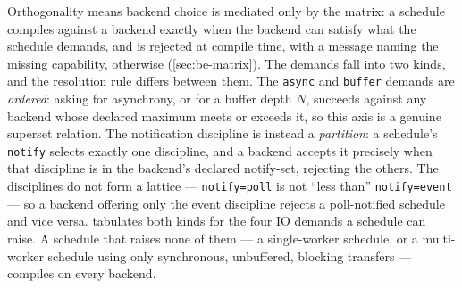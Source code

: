 Orthogonality means backend choice is mediated only by the matrix: a schedule
compiles against a backend exactly when the backend can satisfy what the schedule
demands, and is rejected at compile time, with a message naming the missing
capability, otherwise (\cref{sec:be-matrix}). The demands fall into two kinds, and
the resolution rule differs between them. The \texttt{async} and \texttt{buffer}
demands are \emph{ordered}: asking for asynchrony, or for a buffer depth $N$,
succeeds against any backend whose declared maximum meets or exceeds it, so this
axis is a genuine superset relation. The notification discipline is instead a
\emph{partition}: a schedule's \texttt{notify} selects exactly one discipline, and a
backend accepts it precisely when that discipline is in the backend's declared
notify-set, rejecting the others. The disciplines do not form a lattice ---
\texttt{notify=poll} is not ``less than'' \texttt{notify=event} --- so a backend
offering only the event discipline rejects a poll-notified schedule and vice versa.
 tabulates both kinds for the four IO demands a schedule can
raise. A schedule that raises none of them --- a single-worker schedule, or a
multi-worker schedule using only synchronous, unbuffered, blocking transfers ---
compiles on every backend.

